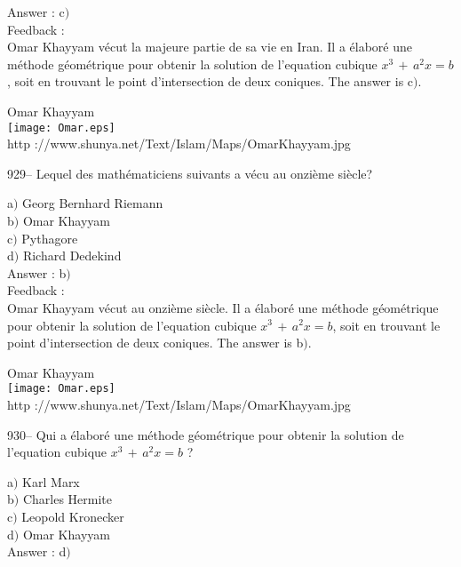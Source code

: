 ﻿\documentclass[letterpaper, 12pt]{article}
\begin{document}
Answer : c$)$\\

Feedback : \\
Omar Khayyam v\'ecut la majeure partie de sa vie en Iran. Il a
\'elabor\'e une m\'ethode g\'eom\'etrique pour obtenir la solution
de l'equation cubique $x^3\,+\,a^2x=b$,
soit en trouvant le point d'intersection de deux coniques. The answer is
c$)$.\\

        \begin{center}
        Omar Khayyam\\
    \texttt{[image: Omar.eps]}\\
        {\footnotesize http
://www.shunya.net/Text/Islam/Maps/OmarKhayyam.jpg}
    \end{center}

929-- Lequel des math\'ematiciens suivants a v\'ecu au onzi\`eme
si\`ecle?

a$)$ Georg Bernhard Riemann \\
b$)$ Omar Khayyam \\
c$)$ Pythagore \\
d$)$ Richard Dedekind\\

Answer : b$)$\\

Feedback :\\
Omar Khayyam v\'ecut au onzi\`eme si\`ecle. Il a \'elabor\'e une
m\'ethode g\'eom\'etrique pour obtenir
la solution de l'equation cubique $x^3\,+\,a^2x=b$, soit en trouvant le
point d'intersection de deux coniques. The answer is b$)$.\\

        \begin{center}
        Omar Khayyam\\
    \texttt{[image: Omar.eps]}\\
        {\footnotesize http
://www.shunya.net/Text/Islam/Maps/OmarKhayyam.jpg}
    \end{center}

930-- Qui a \'elabor\'e une m\'ethode g\'eom\'etrique pour obtenir
la solution de l'equation cubique $x^3\,+\,a^2x=b$ ?

a$)$ Karl Marx \\
b$)$ Charles Hermite \\
c$)$ Leopold Kronecker \\
d$)$ Omar Khayyam \\

Answer : d$)$\\
\end{document}
